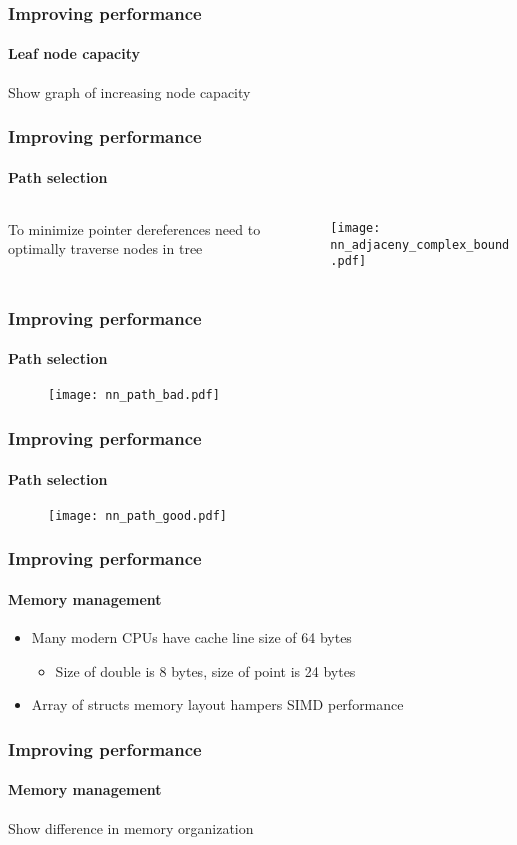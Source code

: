 
\begin{frame}
  \frametitle{Improving performance}
  \framesubtitle{Leaf node capacity}

  {\color{white} Show graph of increasing node capacity}

\end{frame}

\begin{frame}
  \frametitle{Improving performance}
  \framesubtitle{Path selection}

  \begin{columns}[T]
    \begin{column}{.4\textwidth}
      \begin{block}{}%
        {\color{white} To minimize pointer dereferences need to optimally %
        traverse nodes in tree}
      \end{block}
    \end{column}
    \begin{column}{.6\textwidth}
      \begin{block}{}
        \texttt{[image: nn\_adjaceny\_complex\_bound.pdf]}
      \end{block}
    \end{column}
  \end{columns}

\end{frame}

\begin{frame}
  \frametitle{Improving performance}
  \framesubtitle{Path selection}

  \begin{figure}
    \centering
    \texttt{[image: nn\_path\_bad.pdf]}
  \end{figure}

\end{frame}

\begin{frame}
  \frametitle{Improving performance}
  \framesubtitle{Path selection}

  \begin{figure}
    \centering
    \texttt{[image: nn\_path\_good.pdf]}
  \end{figure}

\end{frame}

\begin{frame}
  \frametitle{Improving performance}
  \framesubtitle{Memory management}

  \begin{itemize}
    \item Many modern CPUs have cache line size of 64 bytes
      \begin{itemize}
        \item Size of double is 8 bytes, size of point is 24 bytes
      \end{itemize}
    \item Array of structs memory layout hampers SIMD performance 
  \end{itemize}

\end{frame}

\begin{frame}
  \frametitle{Improving performance}
  \framesubtitle{Memory management}

  \color{white} Show difference in memory organization

\end{frame}
